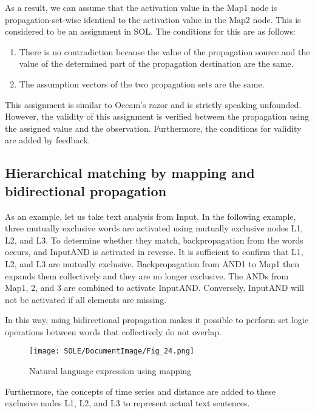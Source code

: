 \documentclass[12pt]{article}
\begin{document}
As a result, we can assume that the activation value in the Map1 node is
propagation-set-wise identical to the activation value in the Map2 node.
This is considered to be an assignment in SOL. The conditions for this
are as follows:

\begin{enumerate}
\def\labelenumi{\arabic{enumi}.}
\item
  There is no contradiction because the value of the propagation source
  and the value of the determined part of the propagation destination
  are the same.
\item
  The assumption vectors of the two propagation sets are the same.
\end{enumerate}

This assignment is similar to Occam's razor and is strictly speaking
unfounded. However, the validity of this assignment is verified between
the propagation using the assigned value and the observation.
Furthermore, the conditions for validity are added by feedback.

\subsection{Hierarchical matching by mapping and bidirectional
propagation}\label{hierarchical-matching-by-mapping-and-bidirectional-propagation}

As an example, let us take text analysis from Input. In the following
example, three mutually exclusive words are activated using mutually
exclusive nodes L1, L2, and L3. To determine whether they match,
backpropagation from the words occurs, and InputAND is activated in
reverse. It is sufficient to confirm that L1, L2, and L3 are mutually
exclusive. Backpropagation from AND1 to Map1 then expands them
collectively and they are no longer exclusive. The ANDs from Map1, 2,
and 3 are combined to activate InputAND. Conversely, InputAND will not
be activated if all elements are missing.

In this way, using bidirectional propagation makes it possible to
perform set logic operations between words that collectively do not
overlap.

\begin{figure}[ht]
  \centering
  \texttt{[image: SOLE/DocumentImage/Fig\_24.png]}
  \caption{Natural language expression using mapping}
  \label{fig:natural_language_expression_using_mapping}
\end{figure}

Furthermore, the concepts of time series and distance are added to these
exclusive nodes L1, L2, and L3 to represent actual text sentences.
\end{document}
